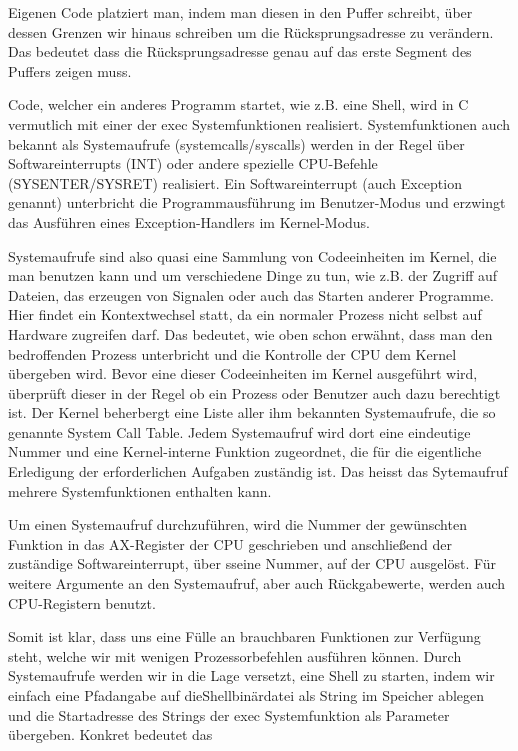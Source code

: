 \documentclass[12pt]{book}
\begin{document}
Eigenen Code platziert man, indem man diesen in den Puffer schreibt, über dessen
Grenzen wir hinaus schreiben um die Rücksprungsadresse zu verändern. Das
bedeutet dass die Rücksprungsadresse genau auf das erste Segment des Puffers
zeigen muss.

Code, welcher ein anderes Programm startet, wie z.B. eine Shell, wird in C
vermutlich mit einer der exec Systemfunktionen realisiert. Systemfunktionen auch
bekannt als Systemaufrufe (systemcalls/syscalls) werden in der Regel über
Softwareinterrupts (INT) oder andere spezielle CPU-Befehle (SYSENTER/SYSRET)
realisiert. Ein Softwareinterrupt (auch Exception genannt) unterbricht die
Programmausführung im Benutzer-Modus und erzwingt das Ausführen eines
Exception-Handlers im Kernel-Modus.

Systemaufrufe sind also quasi eine Sammlung von Codeeinheiten im Kernel, die man
benutzen kann und um verschiedene Dinge zu tun, wie z.B. der Zugriff auf
Dateien, das erzeugen von Signalen oder auch das Starten anderer Programme. Hier
findet ein Kontextwechsel statt, da ein normaler Prozess nicht selbst auf
Hardware zugreifen darf. Das bedeutet, wie oben schon erwähnt, dass man den
bedroffenden Prozess unterbricht und die Kontrolle der CPU dem Kernel übergeben
wird. Bevor eine dieser Codeeinheiten im Kernel ausgeführt wird, überprüft
dieser in der Regel ob ein Prozess oder Benutzer auch dazu berechtigt ist. Der
Kernel beherbergt eine Liste aller ihm bekannten Systemaufrufe, die so genannte
System Call Table. Jedem Systemaufruf wird dort eine eindeutige Nummer und eine
Kernel-interne Funktion zugeordnet, die für die eigentliche Erledigung der
erforderlichen Aufgaben zuständig ist. Das heisst das Sytemaufruf mehrere
Systemfunktionen enthalten kann.

Um einen Systemaufruf durchzuführen, wird die Nummer der gewünschten Funktion in
das AX-Register der CPU geschrieben und anschließend der zuständige
Softwareinterrupt, über sseine Nummer, auf der CPU ausgelöst. Für weitere
Argumente an den Systemaufruf, aber auch Rückgabewerte, werden auch
CPU-Registern benutzt.

Somit ist klar, dass uns eine Fülle an brauchbaren Funktionen zur Verfügung
steht, welche wir mit wenigen Prozessorbefehlen ausführen können. Durch
Systemaufrufe werden wir in die Lage versetzt, eine Shell zu starten, indem wir
einfach eine Pfadangabe auf dieShellbinärdatei als String im Speicher ablegen
und die Startadresse des Strings der exec Systemfunktion als Parameter
übergeben. Konkret bedeutet das
\end{document}
